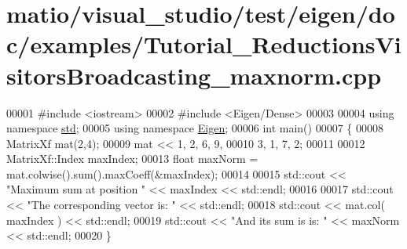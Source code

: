 \hypertarget{matio_2visual__studio_2test_2eigen_2doc_2examples_2_tutorial___reductions_visitors_broadcasting__maxnorm_8cpp_source}{}\section{matio/visual\+\_\+studio/test/eigen/doc/examples/\+Tutorial\+\_\+\+Reductions\+Visitors\+Broadcasting\+\_\+maxnorm.cpp}
\label{matio_2visual__studio_2test_2eigen_2doc_2examples_2_tutorial___reductions_visitors_broadcasting__maxnorm_8cpp_source}

\begin{DoxyCode}
00001 \textcolor{preprocessor}{#include <iostream>}
00002 \textcolor{preprocessor}{#include <Eigen/Dense>}
00003 
00004 \textcolor{keyword}{using namespace }\hyperlink{namespacestd}{std};
00005 \textcolor{keyword}{using namespace }\hyperlink{namespace_eigen}{Eigen};
00006 \textcolor{keywordtype}{int} main()
00007 \{
00008   MatrixXf mat(2,4);
00009   mat << 1, 2, 6, 9,
00010          3, 1, 7, 2;
00011   
00012   MatrixXf::Index   maxIndex;
00013   \textcolor{keywordtype}{float} maxNorm = mat.colwise().sum().maxCoeff(&maxIndex);
00014   
00015   std::cout << \textcolor{stringliteral}{"Maximum sum at position "} << maxIndex << std::endl;
00016 
00017   std::cout << \textcolor{stringliteral}{"The corresponding vector is: "} << std::endl;
00018   std::cout << mat.col( maxIndex ) << std::endl;
00019   std::cout << \textcolor{stringliteral}{"And its sum is is: "} << maxNorm << std::endl;
00020 \}
\end{DoxyCode}
